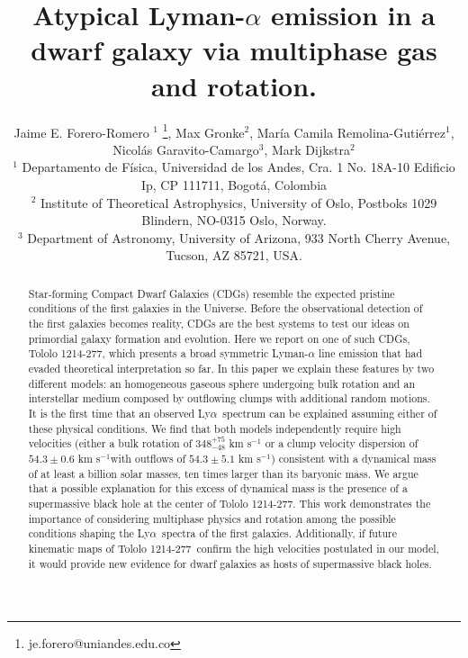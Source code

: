 \documentclass[a4,useAMS,usenatbib,usegraphicx]{mn2e}
\newcommand{\tol}{Tololo 1214-277}
\newcommand{\lya}{Ly$\alpha$}
\newcommand{\sigmaclump}{$54.3\pm 0.6$ km s$^{-1}$}
\newcommand{\inftyclump}{$54.3\pm 5.1$ km s$^{-1}$}
\begin{document}
\title[Atypical Dwarf LAE]{
Atypical Lyman-$\alpha$ emission in a dwarf galaxy via multiphase
gas and rotation.}
\author[J.E. Forero-Romero et al.]
{Jaime E. Forero-Romero $^{1}$ \thanks{je.forero@uniandes.edu.co},
Max Gronke$^2$, 
Mar\'ia Camila Remolina-Guti\'errez$^1$,
\newauthor
Nicol\'as Garavito-Camargo$^3$, 
Mark Dijkstra$^2$\\
$^1$ Departamento de F\'isica, Universidad de los Andes, Cra. 1
  No. 18A-10 Edificio Ip, CP 111711, Bogot\'a, Colombia \\
$^2$ Institute of Theoretical Astrophysics, University of Oslo,
Postboks 1029 Blindern, NO-0315 Oslo, Norway.\\
$^3$ Department of Astronomy, University of Arizona, 933 North Cherry
Avenue, Tucson, AZ 85721, USA. 
}


\maketitle


\begin{abstract}
  Star-forming Compact Dwarf Galaxies (CDGs) resemble the expected
  pristine conditions of the first galaxies in the Universe.    
Before the observational detection of the first galaxies becomes
reality, CDGs are the best systems to test our ideas on primordial
galaxy formation and evolution.    
Here we report on one of such CDGs, \tol, which presents
a broad symmetric Lyman-$\alpha$ line emission that had evaded theoretical
interpretation so far. 
In this paper we explain these features by two different models: an
homogeneous gaseous sphere undergoing bulk rotation and an interstellar
medium composed by outflowing clumps with additional random motions.
It is the first time that an observed \lya\ spectrum can be explained
assuming either of these physical conditions.
We find that both models independently require high velocities
(either a bulk rotation of $348^{+75}_{-48}$ km s$^{-1}$ or a clump velocity
dispersion of \sigmaclump with outflows of
\inftyclump) consistent with a dynamical mass of at
least a billion solar masses, ten times larger than its baryonic mass.   
We argue that a possible explanation for this excess of
dynamical mass is the presence of a supermassive black hole at the
center of \tol. 
This work demonstrates the importance of considering multiphase
physics and rotation among the possible conditions shaping the
\lya\ spectra of the first galaxies.  
Additionally, if future kinematic maps of \tol\ confirm the high
velocities postulated in our model, it would provide new
evidence for dwarf galaxies as hosts of supermassive black
holes.  
\end{abstract}
\end{document}
